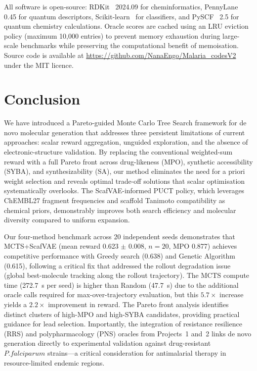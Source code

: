 \documentclass[jcim,article,layout=manuscript]{achemso}
\begin{document}
All software is open-source: RDKit~\cite{RDKit} 2024.09 for cheminformatics,
PennyLane~\cite{Bergholm2022} 0.45 for quantum descriptors,
Scikit-learn~\cite{Pedregosa2011} for classifiers, and PySCF~\cite{Sun2020}
2.5 for quantum chemistry calculations. Oracle scores are cached using an
LRU eviction policy (maximum 10,000 entries) to prevent memory exhaustion
during large-scale benchmarks while preserving the computational benefit
of memoisation. Source code is available at
\url{https://github.com/NanaEngo/Malaria_codesV2} under the MIT licence.

\section{Conclusion}

We have introduced a Pareto-guided Monte Carlo Tree Search framework for
de novo molecular generation that addresses three persistent limitations
of current approaches: scalar reward aggregation, unguided exploration,
and the absence of electronic-structure validation. By replacing the
conventional weighted-sum reward with a full Pareto front across drug-likeness
(MPO), synthetic accessibility (SYBA), and synthesizability (SA), our method
eliminates the need for a priori weight selection and reveals optimal
trade-off solutions that scalar optimisation systematically overlooks. The
ScafVAE-informed PUCT policy, which leverages ChEMBL27 fragment frequencies
and scaffold Tanimoto compatibility as chemical priors, demonstrably improves
both search efficiency and molecular diversity compared to uniform expansion.

Our four-method benchmark across 20 independent seeds demonstrates that
MCTS+ScafVAE (mean reward 0.623 $\pm$ 0.008, $n=20$, MPO 0.877) achieves competitive
performance with Greedy search (0.638) and Genetic Algorithm (0.615),
following a critical fix that addressed the rollout degradation issue
(global best-molecule tracking along the rollout trajectory). The
MCTS compute time (272.7~s per seed) is higher than Random (47.7~s)
due to the additional oracle calls required for max-over-trajectory
evaluation, but this $5.7\times$ increase yields a $2.2\times$ improvement
in reward. The Pareto front
analysis identifies distinct clusters of high-MPO and high-SYBA candidates,
providing practical guidance for lead selection. Importantly, the
integration of resistance resilience (RRS) and polypharmacology (PNS)
oracles from Projects~1 and~2 links de novo generation directly to
experimental validation against drug-resistant $P. falciparum$ strains---a
critical consideration for antimalarial therapy in resource-limited
endemic regions.
\end{document}
